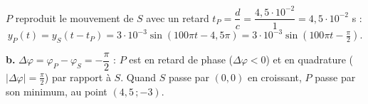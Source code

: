 \documentclass[11pt]{article}
\begin{document}
 $P$ reproduit le mouvement de $S$ avec un retard $t_P = \dfrac{d}{c} = \dfrac{4{,}5\cdot10^{-2}}{1} = 4{,}5\cdot10^{-2}$ s :
\[ y_P(t) = y_S(t - t_P) = 3\cdot10^{-3}\sin(100\pi t - 4{,}5\pi) = 3\cdot10^{-3}\sin\left(100\pi t - \tfrac{\pi}{2}\right). \]

\textbf{b.} $\Delta\varphi = \varphi_P - \varphi_S = -\dfrac{\pi}{2}$ : $P$ est en retard de phase ($\Delta\varphi < 0$) et en quadrature ($|\Delta\varphi| = \frac{\pi}{2}$) par rapport à $S$. Quand $S$ passe par $(0,0)$ en croissant, $P$ passe par son minimum, au point $(4{,}5\,;-3)$.
\end{document}
